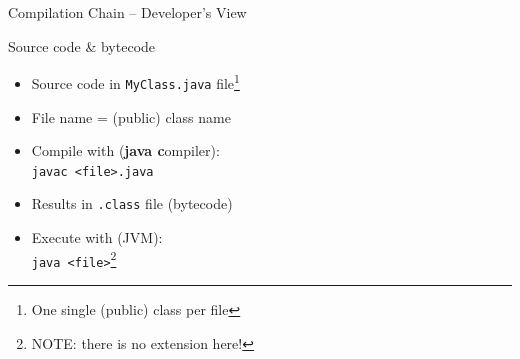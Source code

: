 \documentclass[English,c,%
hyperref={%
    pdftitle={FISA-DE2 OOP in Java},%
    pdfauthor={Muller, Gravier, Laforest, Subercaze},%
    pdfsubject={OOP in Java},%
    pdfkeywords={OOP, Java},%
    colorlinks=true,%
    urlcolor=blue,%
    linkcolor=%
    },%
xcolor={pdftex,svgnames} %
]{beamer}
\begin{document}
\begin{frame}{Compilation Chain -- Developer's View}


\end{frame}

\begin{frame}{Source code \& bytecode}
  \begin{itemize}
    \item Source code in \texttt{MyClass.java} file\footnote{One single (public) class per file}
    \medskip
    \item File name = (public) class name
    \medskip
    \item Compile with (\textbf{java c}ompiler): \\
    \texttt{javac <file>.java}
    \medskip
    \item Results in \texttt{.class} file (bytecode)
    \medskip
    \item Execute with (JVM):\\
    \texttt{java <file>}\footnote{NOTE: there is no extension here!}
  \end{itemize}
\end{frame}
\end{document}
